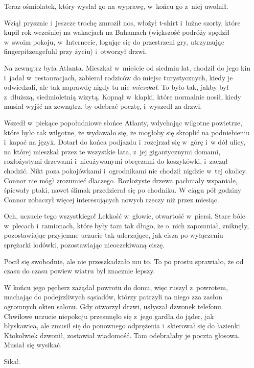 \documentclass[oneside,polish,11pt,rmheadings]{mwbk}
\begin{document}
Teraz ośmiolatek, który wysłał go na wyprawę, w~końcu go z~niej uwolnił.

Wziął prysznic i~jeszcze trochę zmroził nos, włożył t-shirt i~luźne szorty, które kupił rok wcześniej na wakacjach na Bahamach (większość podróży spędził w~swoim pokoju, w~Internecie, logując się do przestrzeni gry, utrzymując fingerpitzengefuhl przy życiu) i~otworzył drzwi.

Na zewnątrz była Atlanta. Mieszkał w~mieście od siedmiu lat, chodził do jego kin i~jadał w~restauracjach, zabierał rodziców do miejsc turystycznych, kiedy je odwiedzali, ale tak naprawdę nigdy tu nie \textit{mieszkał}. To było tak, jakby był z~dłuższą, siedmioletnią wizytą. Kopnął w~klapki, które normalnie nosił, kiedy musiał wyjść na zewnątrz, by odebrać pocztę, i~wyszedł za drzwi.

Wszedł w~piekące popołudniowe słońce Atlanty, wdychając wilgotne powietrze, które było tak wilgotne, że wydawało się, że mogłoby się skroplić na podniebieniu i~kapać na język. Dotarł do końca podjazdu i~rozejrzał się w~górę i~w dół ulicy, na której mieszkał przez te wszystkie lata, z~jej gigantycznymi domami, rozłożystymi drzewami i~nieużywanymi obręczami do koszykówki, i~zaczął chodzić. Nikt poza pokojówkami i~ogrodnikami nie chodził nigdzie w~tej okolicy. Connor nie mógł zrozumieć dlaczego. Rozłożyste drzewa pachniały wspaniale, śpiewały ptaki, nawet ślimak przedzierał się po chodniku. W ciągu pół godziny Connor zobaczył więcej interesujących nowych rzeczy niż przez miesiąc.

Och, uczucie tego wszystkiego! Lekkość w~głowie, otwartość w~piersi. Stare bóle w~plecach i~ramionach, które były tam tak długo, że o~nich zapomniał, zniknęły, pozostawiając przyjemne uczucie tak uderzające, jak cisza po wyłączeniu sprężarki lodówki, pozostawiając nieoczekiwaną ciszę.

Pocił się swobodnie, ale nie przeszkadzało mu to. To po prostu sprawiało, że od czasu do czasu powiew wiatru był znacznie lepszy.

W końcu jego pęcherz zażądał powrotu do domu, więc ruszył z~powrotem, machając do podejrzliwych sąsiadów, którzy patrzyli na niego zza zasłon ogromnych okien salonu. Gdy otworzył drzwi, usłyszał dzwonek telefonu. Chwilowe uczucie niepokoju przesunęło się z~jego gardła do jąder, jak błyskawica, ale zmusił się do ponownego odprężenia i~skierował się do łazienki. Ktokolwiek dzwonił, zostawiał wiadomość. Tam odebrałaby je poczta głosowa. Musiał się wysikać.

Sikał.
\end{document}
